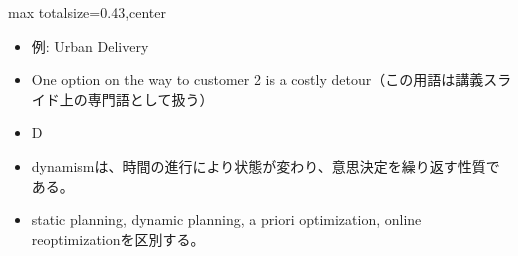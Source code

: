 \clearpage
{}
\begin{minipage}[t]{0.405\textwidth}
\begin{adjustbox}{max totalsize={\textwidth}{0.43\textheight},center}
\begin{minipage}{\textwidth}\scriptsize
{}\begin{itemize}
\item 例: Urban Delivery
\item One option on the way to customer 2 is a costly detour（この用語は講義スライド上の専門語として扱う）
\item D
\end{itemize}\begin{itemize}
\item dynamismは、時間の進行により状態が変わり、意思決定を繰り返す性質である。
\item static planning, dynamic planning, a priori optimization, online reoptimizationを区別する。
\end{itemize}
\end{minipage}
\end{adjustbox}
\end{minipage}\hfill
